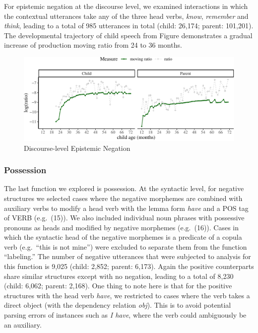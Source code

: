 \documentclass[
  english,
  man,floatsintext]{apa6}
\begin{document}
For epistemic negation at the discourse level, we examined interactions in which the contextual utterances take any of the three head verbs, \emph{know}, \emph{remember} and \emph{think}, leading to a total of 985 utterances in total (child: 26,174; parent: 101,201). The developmental trajectory of child speech from Figure demonstrates a gradual increase of production moving ratio from 24 to 36 months.

\begin{figure}[H]

{\centering \includegraphics{neg_construction_article_files/figure-latex/epistemicdiscourse-1} 

}

\caption{Discourse-level Epistemic Negation}\label{fig:epistemicdiscourse}
\end{figure}

\hypertarget{possession}{%
\subsubsection{Possession}\label{possession}}

The last function we explored is possession. At the syntactic level, for negative structures we selected cases where the negative morphemes are combined with auxiliary verbs to modify a head verb with the lemma form \emph{have} and a POS tag of VERB (e.g.~(15)). We also included individual noun phrases with possessive pronouns as heads and modified by negative morphemes (e.g.~(16)). Cases in which the syntactic head of the negative morphemes is a predicate of a copula verb (e.g.~``this is not mine'') were excluded to separate them from the function ``labeling.'' The number of negative utterances that were subjected to analysis for this function is 9,025 (child: 2,852; parent: 6,173). Again the positive counterparts share similar structures except with no negation, leading to a total of 8,230 (child: 6,062; parent: 2,168). One thing to note here is that for the positive structures with the head verb \emph{have}, we restricted to cases where the verb takes a direct object (with the dependency relation \emph{obj}). This is to avoid potential parsing errors of instances such as \emph{I have}, where the verb could ambiguously be an auxiliary.
\end{document}
